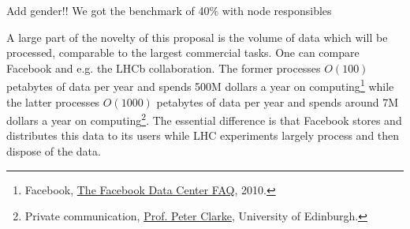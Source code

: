 Add gender!! We got the benchmark of 40\% with node responsibles

A large part of the novelty of this proposal is the volume of data which will be processed, comparable to the largest commercial tasks. 
One can compare Facebook and e.g. the LHCb collaboration.
The former processes $O(100)$ petabytes of data per year and spends 500M dollars a year on computing\footnote{Facebook, \href{http://www.datacenterknowledge.com/the-facebook-data-center-faq-page-three/}{The Facebook Data Center FAQ}, 2010.} while the latter processes  $O(1000)$ petabytes of data per year and spends around 7M dollars a year on computing\footnote{Private communication, \href{mailto:peter.clarke@ed.ac.uk}{Prof. Peter Clarke}, University of Edinburgh.}.
The essential difference is that Facebook stores and distributes this data to its users while LHC experiments largely process and then dispose of the data.

